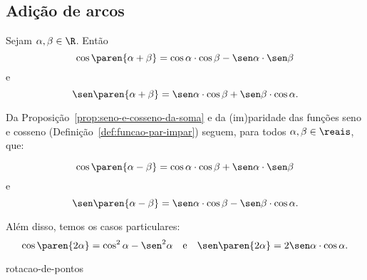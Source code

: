 \subsection{Adição de arcos}

\begin{proposition}
\label{prop:seno-e-cosseno-da-soma}
    Sejam $\alpha, \beta \in \R$. Então
$$\cos \paren{\alpha + \beta} = \cos \alpha \cdot \cos \beta - \sen
\alpha \cdot \sen \beta$$ e
$$\sen \paren{\alpha + \beta} = \sen \alpha \cdot \cos \beta +\sen \beta \cdot
\cos \alpha.$$
\end{proposition}

\begin{remark}
    Da Proposição~\ref{prop:seno-e-cosseno-da-soma} e da (im)paridade das funções seno e cosseno 
    (Definição~\ref{def:funcao-par-impar}) seguem, para todos $\alpha, \beta \in \reais$, que:

$$\cos \paren{\alpha - \beta} = \cos \alpha \cdot \cos \beta + \sen
\alpha \cdot \sen \beta$$ e
$$\sen \paren{\alpha - \beta} = \sen \alpha \cdot \cos \beta - \sen \beta \cdot
\cos \alpha.$$

Além disso, temos os casos particulares:
$$\cos \paren{2\alpha } = \cos^2 \alpha  - \sen^2 \alpha \ \ \text{ e }
\ \ \sen \paren{2\alpha } = 2\sen \alpha \cdot \cos \alpha.$$
\end{remark}

{rotacao-de-pontos}
